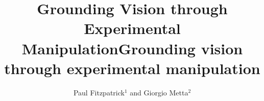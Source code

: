 \documentclass[]{rspublic}
\begin{document}
 

\onecolumn





\title{Grounding Vision through Experimental Manipulation}



\title[Grounding vision]{Grounding vision through experimental manipulation}

\author[P. Fitzpatrick, G. Metta]{Paul Fitzpatrick$^1$ and Giorgio Metta$^2$}


\label{firstpage}

\maketitle































\end{document}
